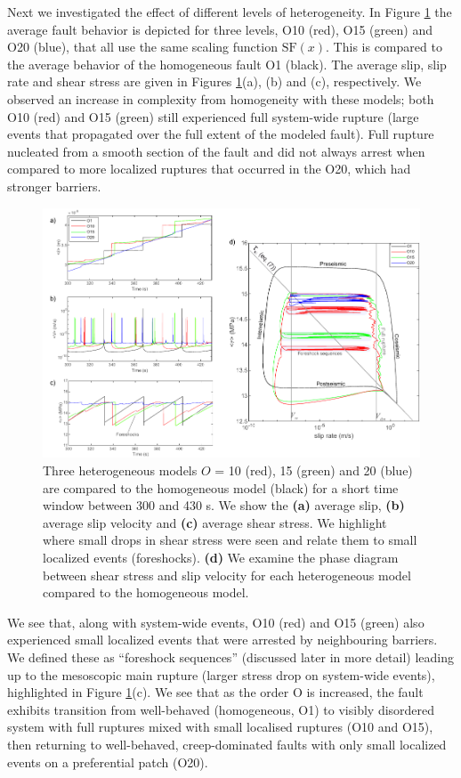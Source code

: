 \documentclass[preprint,1p, 10pt,authoryear]{elsarticle}
\begin{document}
Next we investigated the effect of different levels of heterogeneity. In Figure \ref{fig7} the average fault behavior is depicted for three levels, O10 (red), O15 (green) and O20 (blue), that all use the same scaling function $\mathrm{SF}(x)$.  This is compared to the average behavior of the homogeneous fault O1 (black).  The average slip, slip rate and shear stress are given in Figures \ref{fig7}(a), (b) and (c), respectively.  We observed an increase in complexity from homogeneity with these models; both O10 (red) and O15 (green) still experienced full system-wide rupture (large events that propagated over the full extent of the modeled fault).  Full rupture nucleated from a smooth section of the fault and did not always arrest when compared to more localized ruptures that occurred in the O20, which had stronger barriers. 

\begin{figure}
	\centering
	\includegraphics{FIG7.pdf} 
	\caption{Three heterogeneous models $O$ =  10 (red), 15 (green) and 20 (blue) are compared to the homogeneous model (black) for a short time window between 300 and 430 s. We show the \textbf{(a)} average slip, \textbf{(b)} average slip velocity and \textbf{(c)} average shear stress.  We highlight where small drops in shear stress were seen and relate them to small localized events (foreshocks). \textbf{(d)} We examine the phase diagram between shear stress and slip velocity for each heterogeneous model compared to the homogeneous model.}
	\label{fig7}
\end{figure} 

We see that, along with system-wide events, O10 (red) and O15 (green) also experienced small localized events that were arrested by neighbouring barriers. We defined these as ``foreshock sequences'' (discussed later in more detail) leading up to the mesoscopic main rupture (larger stress drop on system-wide events), highlighted in Figure \ref{fig7}(c). We see that as the order O is increased, the fault exhibits transition from well-behaved (homogeneous, O1) to visibly disordered system with full ruptures mixed with small localised ruptures (O10 and O15), then returning to well-behaved, creep-dominated faults with only small localized events on a preferential patch (O20).
\end{document}
